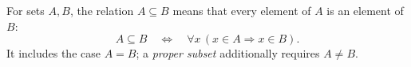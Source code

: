 
For sets $A,B$, the relation $A\subseteq B$ means that every element of $A$ is an element of $B$:
\[
A\subseteq B\quad\Longleftrightarrow\quad\forall x\,(x\in A\Rightarrow x\in B).
\]
It includes the case $A=B$; a \emph{proper subset} additionally requires $A\ne B$.
